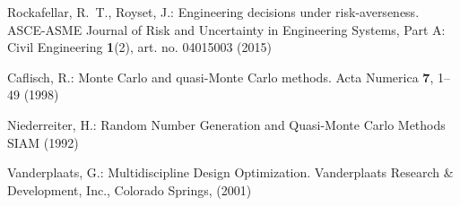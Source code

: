 \documentclass{llncs}
\begin{document}
\begin{thebibliography}{10}
Rockafellar, R.~T., Royset, J.:
\newblock Engineering decisions under risk-averseness.
\newblock ASCE-ASME Journal of Risk and Uncertainty in Engineering Systems, Part A: Civil Engineering
 \textbf{1}(2), art. no. 04015003 (2015)

Caflisch, R.:
\newblock Monte Carlo and quasi-Monte Carlo methods.
\newblock Acta Numerica \textbf{7}, 1--49 (1998)

Niederreiter, H.:
\newblock Random Number Generation and Quasi-Monte Carlo Methods
\newblock SIAM (1992)

Vanderplaats, G.:
\newblock Multidiscipline Design Optimization. 
\newblock Vanderplaats Research \& Development, Inc., Colorado Springs, (2001)

\end{thebibliography}
\end{document}
